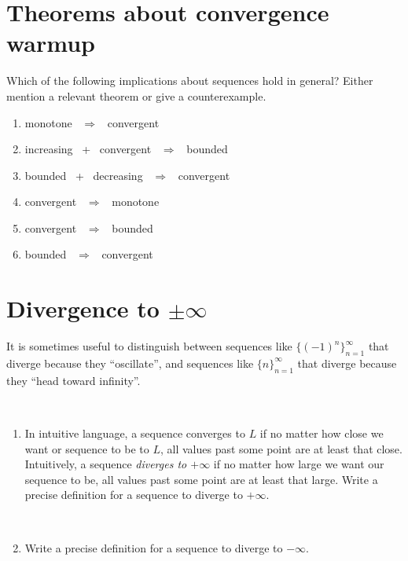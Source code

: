 \documentclass[12pt]{amsart}
\begin{document}
	
	\thispagestyle{empty}
	
	\section*{Theorems about convergence warmup}
	
\noindent Which of the following implications about sequences hold in general? Either mention a relevant theorem or give a counterexample.
	
\begin{multicols}{2}
\begin{enumerate}[label=(\alph*)]
\item monotone \ $\Longrightarrow$ \ convergent
\item increasing \ + \ convergent  \ $\Longrightarrow$ \ bounded
\item bounded \ + \ decreasing  \ $\Longrightarrow$ \ convergent
\item convergent  \ $\Longrightarrow$ \ monotone
\item convergent \ $\Longrightarrow$ \ bounded
\item bounded \ $\Longrightarrow$ \ convergent
\end{enumerate}
\end{multicols}

	
	\section*{Divergence to $\pm \infty$}
	
\noindent It is sometimes useful to distinguish between sequences like $\{(-1)^n\}_{n=1}^\infty$
that diverge because they ``oscillate'', and sequences like $
\{n\}_{n=1}^\infty$
that diverge because they ``head toward infinity''.

\


\begin{enumerate}[label=(\Roman*)]

\item In intuitive language, a sequence converges to $L$ if no matter how close we want or sequence to be to $L$, all values past some point are at least that close. Intuitively, a sequence \emph{diverges to $+\infty$} if no matter how large we want our sequence to be, all values past some point are at least that large. Write a precise definition for a sequence to diverge to $+\infty$.

\

\item Write a precise definition for a sequence to diverge to $-\infty$.

\end{enumerate}
\end{document}
